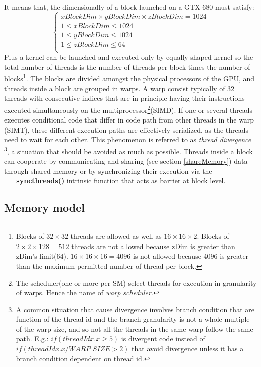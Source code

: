 It means that, the dimensionally of a
block launched on a GTX 680 must satisfy:
\[
\begin{cases} 

			xBlockDim \times yBlockDim \times zBlockDim=1024 \\
			 1\le xBlockDim \le 1024 \\
			  1\le yBlockDim \le 1024 \\
			  1\le zBlockDim \le 64\\  
\end{cases}
\]
Plus a kernel can be launched and executed only by equally shaped kernel so the
total number of threads is the number of threads per block times the number of blocks\footnote{Blocks of
\(32\times32\) threads are allowed as well as \(16\times16\times2\). Blocks of
\(2\times2\times128=512\) threads are not allowed because zDim is greater than zDim's limit(64).
\(16\times16\times16=4096\) is not allowed because 4096 is greater than the maximum
permitted number of thread per block.}.
The blocks are divided amongst the physical processors of the GPU, and threads
inside a block are grouped in warps.
A warp consist typically of 32 threads with consecutive indices that are in
principle having their instructions executed simultaneously on the
multiprocessor\footnote{The scheduler(one or more per SM) select threads for
execution in granularity of warps. Hence the name of \emph{warp
scheduler}.}(SIMD).
If one or several threads executes conditional code that differ in code path
from other threads in the warp (SIMT), these different execution paths are
effectively serialized, as the threads need to wait for each other. This
phenomenon is referred to as \emph{thread divergence}\label{threadDivergence}
\footnote{A common situation that cause divergence involves branch condition
that are function of the thread id and the branch granularity is not a whole
multiple of the warp size, and so not all the threads in the same warp follow the same path.
E.g.: \(if (threadIdx.x \ge 5)\) is divergent code instead of 
\(if (threadIdx.x / WARP\_SIZE > 2)\) that avoid divergence unless it has a
branch condition dependent on thread id.
}, a situation that should be avoided as much as possible.
Threads inside a block can cooperate by communicating and sharing (see section
\ref{shareMemory}) data through shared memory or by synchronizing their
execution via the \textbf{\_\_syncthreads()} intrinsic function that acts as barrier at block
level. 

\subsection{Memory model}\label{memoryModel}


